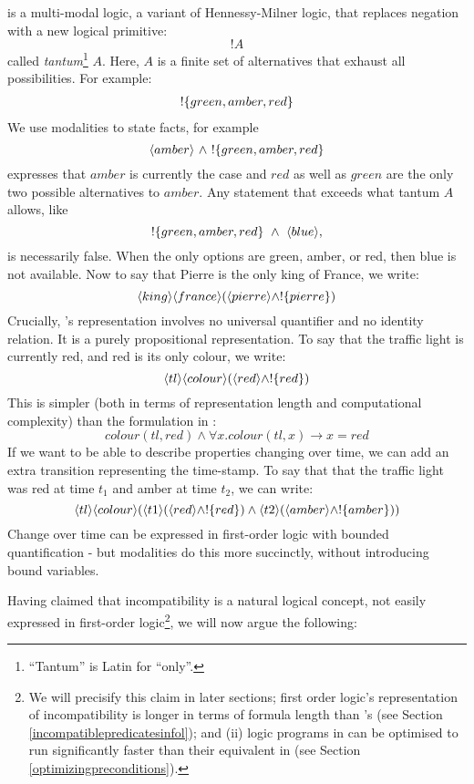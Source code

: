 \Cathoristic{} is a multi-modal logic, a variant of Hennessy-Milner logic,
that replaces negation with a new logical primitive:
\[
   !A
\]
called \emph{tantum}\footnote{``Tantum'' is Latin for ``only''.} $A$. Here, $A$ is a finite set of alternatives
that exhaust all possibilities.  For example:
\begin{eqnarray*}
! \{green, amber, red\}
\end{eqnarray*}
We use modalities to state  facts, for example
\[
   \langle amber \rangle\ \land\ !\{green, amber, red\} 
\]
expresses that $amber$ is currently the case and $red$ as well as
$green$ are the only two possible alternatives to $amber$.  Any
statement that exceeds what tantum $A$ allows, like
\[
   !\{green, amber, red\}\ \AND\ \MAY{blue},
\]
is necessarily false.  When the only options are green, amber, or red,
then blue is not available.  Now to say that Pierre is the only king
of France, we write:
\[
\langle king \rangle \langle france \rangle (\langle pierre \rangle \land ! \{pierre\})
\]
Crucially, \cathoristic{}'s representation involves no
universal quantifier and no identity relation.  It is a purely
propositional representation.  To say that the traffic
light is currently red, and red is its only colour, we write:
\[
\langle tl \rangle \langle colour \rangle (\langle red \rangle \land !\{red\})
\]
This is simpler (both in terms of representation length and
computational complexity) than the formulation in \fol{}:
\[
colour(tl, red) \land \forall x . colour(tl, x) \rightarrow x = red
\]
If we want to be able to describe properties changing over time, we
can add an extra transition representing the time-stamp.  To say that
that the traffic light was red at time $t_1$ and amber at time $t_2$,
we can write:
\[
   \langle tl \rangle \langle colour \rangle (\langle t1 \rangle (\langle red \rangle \land !\{red\}) \land \langle t2 \rangle (\langle amber \rangle \land !\{amber\}))
\]
Change over time can be expressed in first-order logic with bounded
quantification - but modalities do this more succinctly, without introducing bound variables.

Having claimed that incompatibility is a natural logical concept, not
easily expressed in first-order logic\footnote{We will precisify this
  claim in later sections; first order logic's representation of
  incompatibility is longer in terms of formula length than \cathoristic{}'s (see
  Section \ref{incompatiblepredicatesinfol}); and (ii) logic programs
  in \cathoristic{} can be optimised to run significantly faster than their
  equivalent in \fol{} (see Section \ref{optimizingpreconditions}).}, we
will now argue the following:

